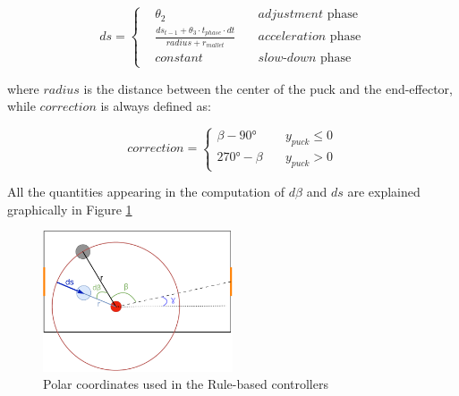 \begin{equation*}
    ds = \left\{
        \begin{aligned}
            &\theta_2                                                                    \quad & adjustment \text{ phase}\\
            &\frac{ds_{t-1} + \theta_3 \cdot t_{phase} \cdot dt}{radius + r_{mallet}}    \quad & acceleration \text{ phase}\\
            &constant                                                                    \quad & slow\text{-}down \text{ phase}
        \end{aligned}
    \right.
\end{equation*}

where $radius$ is the distance between the center of the puck and the end-effector, while $correction$ is always defined as:

\begin{equation*}
    correction = \left\{
        \begin{aligned}
            \beta - 90° \quad&y_{puck} \le 0 \\
            270° - \beta \quad&y_{puck} > 0
        \end{aligned}
    \right.
\end{equation*}

All the quantities appearing in the computation of $d\beta$ and $ds$ are explained graphically in Figure \ref{fig:polar_coordinates}

\begin{figure}
    \centering
    \includegraphics[width=0.5\textwidth]{Images/polar_coordinates.pdf}
    \caption{Polar coordinates used in the Rule-based controllers}
    \label{fig:polar_coordinates}
\end{figure}

